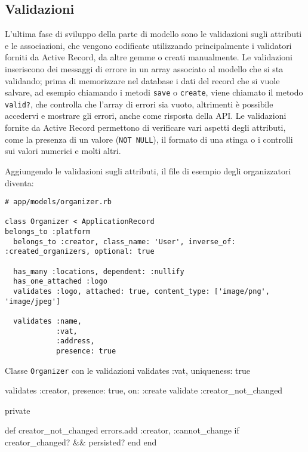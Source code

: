 \subsection{Validazioni} \label{code:validates}
L'ultima fase di sviluppo della parte di modello sono le validazioni sugli attributi e le associazioni, che vengono codificate utilizzando principalmente i validatori forniti da Active Record, da altre gemme o creati manualmente. Le validazioni inseriscono dei messaggi di errore in un array associato al modello che si sta validando; prima di memorizzare nel database i dati del record che si vuole salvare, ad esempio chiamando i metodi \verb|save| o \verb|create|, viene chiamato il metodo \verb|valid?|, che controlla che l'array di errori sia vuoto, altrimenti è possibile accedervi e mostrare gli errori, anche come risposta della API. Le validazioni fornite da Active Record permettono di verificare vari aspetti degli attributi, come la presenza di un valore (\verb|NOT NULL|), il formato di una stinga o i controlli sui valori numerici e molti altri.

Aggiungendo le validazioni sugli attributi, il file di esempio degli organizzatori diventa:

\begin{verbatim}
# app/models/organizer.rb

class Organizer < ApplicationRecord
belongs_to :platform
  belongs_to :creator, class_name: 'User', inverse_of: :created_organizers, optional: true
  
  has_many :locations, dependent: :nullify
  has_one_attached :logo
  validates :logo, attached: true, content_type: ['image/png', 'image/jpeg']

  validates :name,
            :vat,
            :address,
            presence: true
\end{verbatim}

\begin{code}{Classe \texttt{Organizer} con le validazioni}
  validates :vat, uniqueness: true

  validates :creator, presence: true, on: :create
  validate :creator_not_changed

private

  def creator_not_changed
    errors.add :creator, :cannot_change if creator_changed? && persisted?
  end
end
\end{code}

